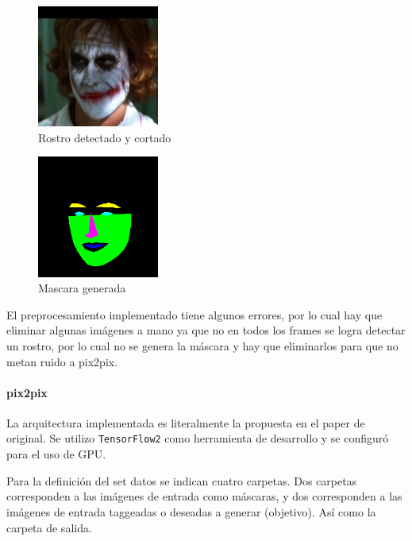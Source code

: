 \documentclass[10pt,journal,compsoc]{IEEEtran}\usepackage[T1]{fontenc}                              %
\begin{document}
\begin{figure}[!htb]
  \begin{center}
    \includegraphics[width=4cm]{./imgs/14_02_rostro.png}
    \caption{Rostro detectado y cortado}
    \label{fig:15}
  \end{center}
\end{figure}

\begin{figure}[!htb]
  \begin{center}
    \includegraphics[width=4cm]{./imgs/14_03_mascara.png}
    \caption{Mascara generada}
    \label{fig:16}
  \end{center}
\end{figure}

El preprocesamiento implementado tiene algunos errores, por lo cual hay que
eliminar algunas imágenes a mano ya que no en todos los frames se logra detectar
un rostro, por lo cual no se genera la máscara y hay que eliminarlos para que no
metan ruido a pix2pix.

\paragraph{pix2pix}

La arquitectura implementada es literalmente la propuesta en el paper de
original. Se utilizo \texttt{TensorFlow2} como herramienta de desarrollo
y se configuró para el uso de GPU.

Para la definición del set datos se indican cuatro carpetas. Dos
carpetas corresponden a las imágenes de entrada como máscaras, y dos
corresponden a las imágenes de entrada taggeadas o deseadas a generar
(objetivo). Así como la carpeta de salida.
\end{document}
